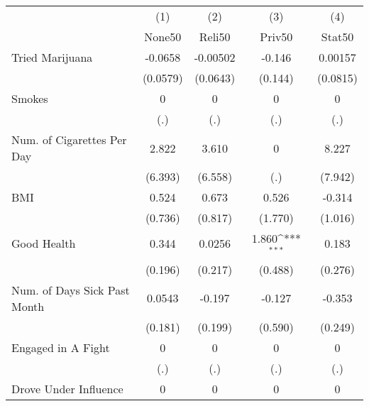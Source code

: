 {
\def\sym#1{\ifmmode^{#1}\else\(^{#1}\)\fi}
\begin{tabular}{l*{4}{c}}
\hline\hline
            &\multicolumn{1}{c}{(1)}&\multicolumn{1}{c}{(2)}&\multicolumn{1}{c}{(3)}&\multicolumn{1}{c}{(4)}\\
            &\multicolumn{1}{c}{None50}&\multicolumn{1}{c}{Reli50}&\multicolumn{1}{c}{Priv50}&\multicolumn{1}{c}{Stat50}\\
\hline
Tried Marijuana&     -0.0658         &    -0.00502         &      -0.146         &     0.00157         \\
            &    (0.0579)         &    (0.0643)         &     (0.144)         &    (0.0815)         \\
[1em]
Smokes      &           0         &           0         &           0         &           0         \\
            &         (.)         &         (.)         &         (.)         &         (.)         \\
[1em]
Num. of Cigarettes Per Day&       2.822         &       3.610         &           0         &       8.227         \\
            &     (6.393)         &     (6.558)         &         (.)         &     (7.942)         \\
[1em]
BMI         &       0.524         &       0.673         &       0.526         &      -0.314         \\
            &     (0.736)         &     (0.817)         &     (1.770)         &     (1.016)         \\
[1em]
Good Health &       0.344         &      0.0256         &       1.860\sym{***}&       0.183         \\
            &     (0.196)         &     (0.217)         &     (0.488)         &     (0.276)         \\
[1em]
Num. of Days Sick Past Month&      0.0543         &      -0.197         &      -0.127         &      -0.353         \\
            &     (0.181)         &     (0.199)         &     (0.590)         &     (0.249)         \\
[1em]
Engaged in A Fight&           0         &           0         &           0         &           0         \\
            &         (.)         &         (.)         &         (.)         &         (.)         \\
[1em]
Drove Under Influence&           0         &           0         &           0         &           0         \\

\end{tabular}}
